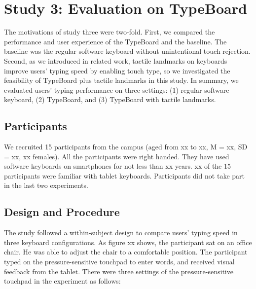 \section{Study 3: Evaluation on TypeBoard}

The motivations of study three were two-fold. First, we compared the performance and user experience of the TypeBoard and the baseline. The baseline was the regular software keyboard without unintentional touch rejection. Second, as we introduced in related work, tactile landmarks on keyboards improve users' typing speed by enabling touch type, so we investigated the feasibility of TypeBoard plus tactile landmarks in this study. In summary, we evaluated users' typing performance on three settings: (1) regular software keyboard, (2) TypeBoard, and (3) TypeBoard with tactile landmarks.


\subsection{Participants}

We recruited 15 participants from the campus (aged from xx to xx, M = xx, SD = xx, xx females). All the participants were right handed. They have used software keyboards on smartphones for not less than xx years. xx of the 15 participants were familiar with tablet keyboards. Participants did not take part in the last two experiments.


\subsection{Design and Procedure}

The study followed a within-subject design to compare users' typing speed in three keyboard configurations. As figure xx shows, the participant sat on an office chair. He was able to adjust the chair to a comfortable position. The participant typed on the pressure-sensitive touchpad to enter words, and received visual feedback from the tablet. There were three settings of the pressure-sensitive touchpad in the experiment as follows:

